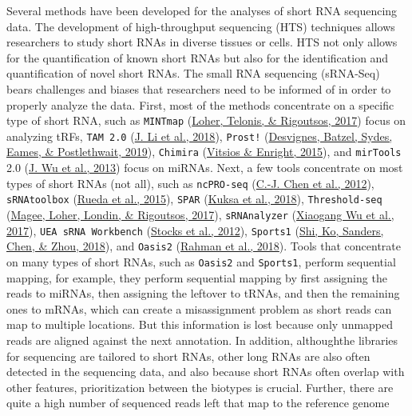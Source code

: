 \documentclass[12pt,twoside]{reedthesis}
\begin{document}
Several methods have been developed for the analyses of short RNA
sequencing data. The development of high-throughput sequencing (HTS)
techniques allows researchers to study short RNAs in diverse tissues or
cells. HTS not only allows for the quantification of known short RNAs
but also for the identification and quantification of novel short RNAs.
The small RNA sequencing (sRNA-Seq) bears challenges and biases that
researchers need to be informed of in order to properly analyze the
data. First, most of the methods concentrate on a specific type of short
RNA, such as \texttt{MINTmap} (\protect\hyperlink{ref-loher2017}{Loher, Telonis, \& Rigoutsos, 2017}) focus on analyzing tRFs, \texttt{TAM\ 2.0}
(\protect\hyperlink{ref-li2018}{J. Li et al., 2018}), \texttt{Prost!} (\protect\hyperlink{ref-desvignes2019}{Desvignes, Batzel, Sydes, Eames, \& Postlethwait, 2019}), \texttt{Chimira} (\protect\hyperlink{ref-vitsios2015}{Vitsios \& Enright, 2015}), and \texttt{mirTools}
2.0 (\protect\hyperlink{ref-wu2013}{J. Wu et al., 2013}) focus on miRNAs. Next, a few tools concentrate on most
types of short RNAs (not all), such as \texttt{ncPRO-seq} (\protect\hyperlink{ref-chen2012}{C.-J. Chen et al., 2012}),
\texttt{sRNAtoolbox} (\protect\hyperlink{ref-rueda2015}{Rueda et al., 2015}), \texttt{SPAR} (\protect\hyperlink{ref-kuksa2018}{Kuksa et al., 2018}), \texttt{Threshold-seq} (\protect\hyperlink{ref-magee2017}{Magee, Loher, Londin, \& Rigoutsos, 2017}),
\texttt{sRNAnalyzer} (\protect\hyperlink{ref-wu2017}{Xiaogang Wu et al., 2017}), \texttt{UEA\ sRNA\ Workbench} (\protect\hyperlink{ref-stocks2012}{Stocks et al., 2012}), \texttt{Sports1}
(\protect\hyperlink{ref-shi2018}{Shi, Ko, Sanders, Chen, \& Zhou, 2018}), and \texttt{Oasis2} (\protect\hyperlink{ref-rahman2018}{Rahman et al., 2018}). Tools that concentrate on many
types of short RNAs, such as \texttt{Oasis2} and \texttt{Sports1}, perform sequential
mapping, for example, they perform sequential mapping by first assigning
the reads to miRNAs, then assigning the leftover to tRNAs, and then the
remaining ones to mRNAs, which can create a misassignment problem as
short reads can map to multiple locations. But this information is lost
because only unmapped reads are aligned against the next annotation. In
addition, althoughthe libraries for sequencing are tailored to short
RNAs, other long RNAs are also often detected in the sequencing data,
and also because short RNAs often overlap with other features,
prioritization between the biotypes is crucial. Further, there are quite
a high number of sequenced reads left that map to the reference genome
\end{document}
